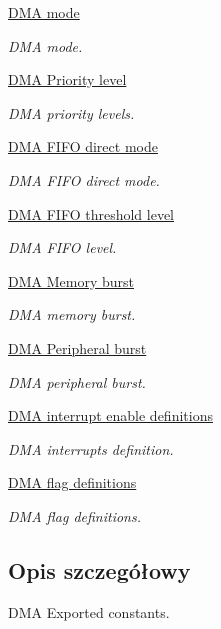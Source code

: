 \begin{DoxyCompactItemize}
\hyperlink{group___d_m_a__mode}{D\+M\+A mode}
\begin{DoxyCompactList}\small\item\em D\+MA mode. \end{DoxyCompactList}\item 
\hyperlink{group___d_m_a___priority__level}{D\+M\+A Priority level}
\begin{DoxyCompactList}\small\item\em D\+MA priority levels. \end{DoxyCompactList}\item 
\hyperlink{group___d_m_a___f_i_f_o__direct__mode}{D\+M\+A F\+I\+F\+O direct mode}
\begin{DoxyCompactList}\small\item\em D\+MA F\+I\+FO direct mode. \end{DoxyCompactList}\item 
\hyperlink{group___d_m_a___f_i_f_o__threshold__level}{D\+M\+A F\+I\+F\+O threshold level}
\begin{DoxyCompactList}\small\item\em D\+MA F\+I\+FO level. \end{DoxyCompactList}\item 
\hyperlink{group___d_m_a___memory__burst}{D\+M\+A Memory burst}
\begin{DoxyCompactList}\small\item\em D\+MA memory burst. \end{DoxyCompactList}\item 
\hyperlink{group___d_m_a___peripheral__burst}{D\+M\+A Peripheral burst}
\begin{DoxyCompactList}\small\item\em D\+MA peripheral burst. \end{DoxyCompactList}\item 
\hyperlink{group___d_m_a__interrupt__enable__definitions}{D\+M\+A interrupt enable definitions}
\begin{DoxyCompactList}\small\item\em D\+MA interrupts definition. \end{DoxyCompactList}\item 
\hyperlink{group___d_m_a__flag__definitions}{D\+M\+A flag definitions}
\begin{DoxyCompactList}\small\item\em D\+MA flag definitions. \end{DoxyCompactList}\end{DoxyCompactItemize}


\subsection{Opis szczegółowy}
D\+MA Exported constants. 

